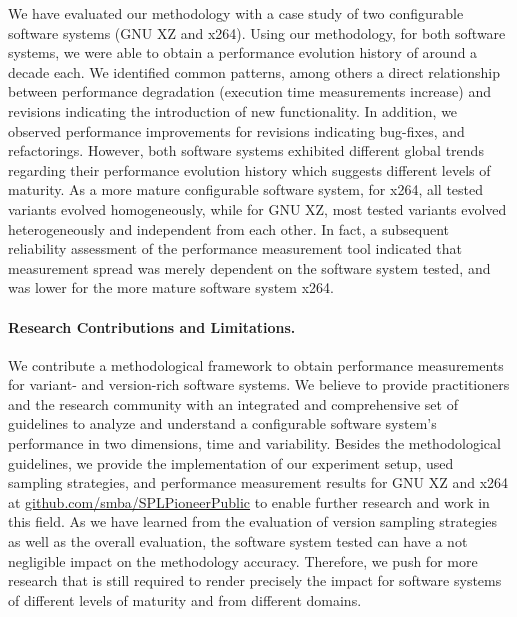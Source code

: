 We have evaluated our methodology with a case study of two configurable software
systems (GNU XZ and x264). Using our methodology, for both software systems, we
were able to obtain a performance evolution history  of around a decade each.
We identified common patterns, among others a direct relationship between
performance degradation (execution time measurements increase) and revisions
indicating the introduction of new functionality. In addition, we observed
performance improvements for revisions indicating bug-fixes, and refactorings.
However, both software systems exhibited different global trends regarding
their performance evolution history which suggests different levels of
maturity. As a more mature configurable software system, for x264, all tested
variants evolved homogeneously, while for GNU XZ, most tested variants evolved
heterogeneously and independent from each other. In fact, a subsequent
reliability assessment of the performance measurement tool indicated that
measurement spread was merely dependent on the software system tested, and was
lower for the more mature software system x264.

\paragraph{Research Contributions and Limitations.} We contribute a
methodological framework to obtain performance measurements for variant- and
version-rich software systems. We believe to provide practitioners and the
research community with an integrated and comprehensive set of guidelines to
analyze and understand a configurable software system’s performance in two
dimensions, time and variability. Besides the methodological guidelines, we
provide the implementation of our experiment setup, used sampling strategies,
and performance measurement results for GNU XZ and x264 at
\url{github.com/smba/SPLPioneerPublic} to enable further research and work in
this field.
As we have learned from the evaluation of version sampling strategies as well
as the overall evaluation, the software system tested can have a not negligible
impact on the methodology accuracy. Therefore, we push for more research that
is still required to render precisely the impact for software systems of
different levels of maturity and from different domains.

